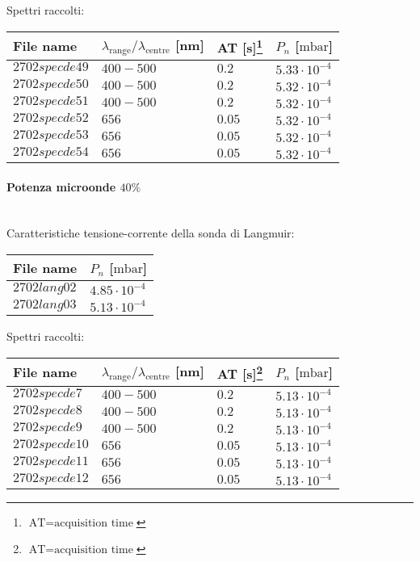 Spettri raccolti:
\begin{center}
\begin{tabular}{p{3cm}p{4cm}p{2cm}p{3cm}}
\toprule
File name	&$\lambda_\text{range}\text{/}\lambda_\text{centre}$ [nm] &AT [s]\footnote{$\text{AT}=\text{acquisition time}$} &$P_{n}$ [$\si{\milli\bar}$]\\
\midrule
$2702specde49$	&$400-500$	&$0.2$		&$5.33\cdot10^{-4}$\\
$2702specde50$	&$400-500$	&$0.2$		&$5.32\cdot10^{-4}$\\
$2702specde51$	&$400-500$	&$0.2$		&$5.32\cdot10^{-4}$\\
$2702specde52$	&$656$		&$0.05$		&$5.32\cdot10^{-4}$\\
$2702specde53$	&$656$		&$0.05$		&$5.32\cdot10^{-4}$\\
$2702specde54$	&$656$		&$0.05$		&$5.32\cdot10^{-4}$\\

\bottomrule
\end{tabular}
\end{center}

\paragraph*{Potenza microonde $\text{40\%}$} ~\\
Caratteristiche tensione-corrente della sonda di Langmuir:
\begin{center}
\begin{tabular}{p{3cm}p{3cm}}
\toprule
File name	&$P_n$ [$\si{\milli\bar}$]\\
\midrule
$2702lang02$	&$4.85\cdot10^{-4}$\\
$2702lang03$	&$5.13\cdot10^{-4}$\\
\bottomrule
\end{tabular}
\end{center}

Spettri raccolti:
\begin{center}
\begin{tabular}{p{3cm}p{4cm}p{2cm}p{3cm}}
\toprule
File name	&$\lambda_\text{range}\text{/}\lambda_\text{centre}$ [nm] 	&AT [s]\footnote{$\text{AT}=\text{acquisition time}$} &$P_n$ [$\si{\milli\bar}$]\\
\midrule
$2702specde7$	&$400-500$	&$0.2$		&$5.13\cdot10^{-4}$\\
$2702specde8$	&$400-500$	&$0.2$		&$5.13\cdot10^{-4}$\\
$2702specde9$	&$400-500$	&$0.2$		&$5.13\cdot10^{-4}$\\
$2702specde10$	&$656$		&$0.05$		&$5.13\cdot10^{-4}$\\
$2702specde11$	&$656$		&$0.05$		&$5.13\cdot10^{-4}$\\
$2702specde12$	&$656$		&$0.05$		&$5.13\cdot10^{-4}$\\
\bottomrule
\end{tabular}
\end{center}

